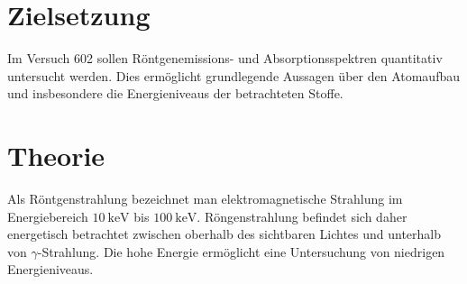 \setcounter{page}{1}
\section*{Zielsetzung}
Im Versuch 602 sollen Röntgenemissions- und Absorptionsspektren quantitativ untersucht werden.
Dies ermöglicht grundlegende Aussagen über den Atomaufbau und insbesondere die Energieniveaus
der betrachteten Stoffe.
\section{Theorie}
Als Röntgenstrahlung bezeichnet man elektromagnetische Strahlung im Energiebereich $\SI{10}{\kilo\eV}$
bis $\SI{100}{\kilo\eV}$. Röngenstrahlung befindet sich daher energetisch betrachtet zwischen oberhalb des sichtbaren Lichtes und
unterhalb von $\gamma$-Strahlung. Die hohe Energie ermöglicht eine Untersuchung von niedrigen Energieniveaus.
